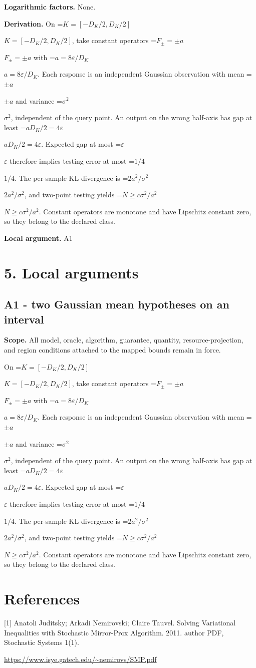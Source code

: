 \documentclass[10pt,a4paper]{article}
\newcommand{\AtlasMath}[1]{\par\begingroup\centering\setbox0=\hbox{$\displaystyle #1$}\ifdim\wd0>1.4\linewidth\typeout{ATLAS WIDE FORMULA: \the\wd0}\fi\ifdim\wd0>\linewidth\resizebox{\linewidth}{!}{\box0}\else\box0\fi\par\endgroup}
\newcommand{\AtlasInlineMath}[1]{\begingroup\setbox0=\hbox{$#1$}\ifdim\wd0>.4\linewidth\endgroup\AtlasMath{#1}\else\endgroup$#1$\fi}
\begin{document}
\textbf{Logarithmic factors.} None.

\textbf{Derivation.} On \AtlasInlineMath{K=[-D_K/2,D_K/2]}, take constant operators \AtlasInlineMath{F_\pm=\pm a} with \AtlasInlineMath{a=8\varepsilon/D_K}. Each response is an independent Gaussian observation with mean \AtlasInlineMath{\pm a} and variance \AtlasInlineMath{\sigma^2}, independent of the query point. An output on the wrong half-axis has gap at least \AtlasInlineMath{aD_K/2=4\varepsilon}. Expected gap at most \AtlasInlineMath{\varepsilon} therefore implies testing error at most \AtlasInlineMath{1/4}. The per-sample KL divergence is \AtlasInlineMath{2a^2/\sigma^2}, and two-point testing yields \AtlasInlineMath{N\ge c\sigma^2/a^2}. Constant operators are monotone and have Lipschitz constant zero, so they belong to the declared class.

\textbf{Local argument.} A1

\section{5. Local arguments}
\subsection{A1 - two Gaussian mean hypotheses on an interval}
\textbf{Scope.} All model, oracle, algorithm, guarantee, quantity, resource-projection, and region conditions attached to the mapped bounds remain in force.

On \AtlasInlineMath{K=[-D_K/2,D_K/2]}, take constant operators \AtlasInlineMath{F_\pm=\pm a} with \AtlasInlineMath{a=8\varepsilon/D_K}. Each response is an independent Gaussian observation with mean \AtlasInlineMath{\pm a} and variance \AtlasInlineMath{\sigma^2}, independent of the query point. An output on the wrong half-axis has gap at least \AtlasInlineMath{aD_K/2=4\varepsilon}. Expected gap at most \AtlasInlineMath{\varepsilon} therefore implies testing error at most \AtlasInlineMath{1/4}. The per-sample KL divergence is \AtlasInlineMath{2a^2/\sigma^2}, and two-point testing yields \AtlasInlineMath{N\ge c\sigma^2/a^2}. Constant operators are monotone and have Lipschitz constant zero, so they belong to the declared class.

\section{References}
[1] Anatoli Juditsky; Arkadi Nemirovski; Claire Tauvel. Solving Variational Inequalities with Stochastic Mirror-Prox Algorithm. 2011. author PDF, Stochastic Systems 1(1).

\url{https://www.isye.gatech.edu/~nemirovs/SMP.pdf}
\end{document}

